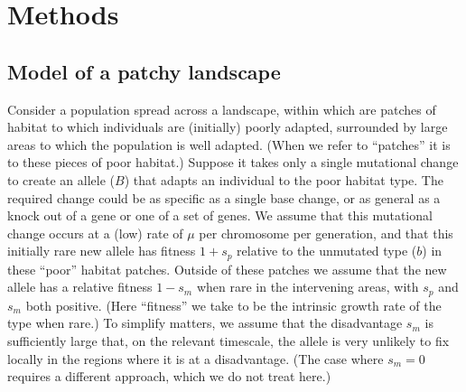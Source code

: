 \documentclass{article}
\begin{document}






\section{Methods}

\subsection{Model of a patchy landscape}
\label{ss:patchyspace}

Consider a population spread across a landscape, 
within which are patches of habitat to which individuals are (initially) poorly adapted,
surrounded by large areas to which the population is well adapted.
(When we refer to ``patches'' it is to these pieces of poor habitat.)
Suppose it takes only a single mutational change to create an allele
($B$) that adapts an individual to the poor habitat type.
The required change could be as specific as a single base change, 
or as general as a knock out of a gene or one of a set of genes.
We assume that this mutational change occurs at a (low) rate of $\mu$ per chromosome per generation,
and that this initially rare new allele has fitness $1+s_p$ relative to the unmutated type ($b$) in these ``poor'' habitat patches.
Outside of these patches we assume that the new allele has a relative fitness
$1-s_m$  when rare in the intervening areas, with $s_p$ and $s_m$ both positive.
(Here ``fitness'' we take to be the intrinsic growth rate of the type when rare.)
To simplify matters, we assume that the disadvantage $s_m$ 
is sufficiently large that, on the relevant timescale,
the allele is very unlikely to fix locally in the regions where it is at a disadvantage.
(The case where $s_m=0$ requires a different approach, which we do not treat here.)
\end{document}
